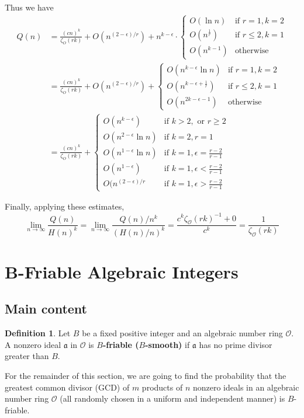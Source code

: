 \documentclass[10pt,a4paper]{article}
\theoremstyle{definition}
\newtheorem{definition}{Definition}[section]
\theoremstyle{remark}
\begin{document}
	Thus we have
	\begin{align}
		Q(n)&=\frac{(cn)^k}{\zeta_{O}(rk)}+O(n^{(2-\epsilon)/r}) + n^{k-\epsilon} \cdot \begin{cases}
			O(\ln n) & \text{if } r=1, k=2 \\
			O(n^\frac{1}{r}) & \text{if } r\leq2, k=1 \\
			O(n^{k-1}) & \text{otherwise}
		\end{cases}\\
		&=\frac{(cn)^k}{\zeta_{O}(rk)}+O(n^{(2-\epsilon)/r}) + \begin{cases}
			O(n^{k-\epsilon}\ln n) & \text{if  } r=1, k=2 \\
			O(n^{k-\epsilon+\frac{1}{r}}) & \text{if } r\leq2, k=1 \\
			O(n^{2k-\epsilon-1}) & \text{otherwise}
		\end{cases}\\ 
	&=\frac{(cn)^k}{\zeta_{O}(rk)} + \begin{cases}
		O(n^{k-\epsilon}) & \text{if  } k>2, \text{ or } r \geq 2\\
		O(n^{2-\epsilon} \ln n) & \text{if  } k=2, r=1 \\
		O(n^{1-\epsilon} \ln n) & \text{if } k=1, \epsilon=\frac{r-2}{r-1} \\
		O(n^{1-\epsilon}) & \text{if } k=1, \epsilon< \frac{r-2}{r-1}\\
		O(n^{(2-\epsilon)/r} & \text{if } k=1, \epsilon > \frac{r-2}{r-1}
	\end{cases}
	\end{align}

	Finally, applying these estimates, 
	\begin{equation}
		\lim\limits_{n\to\infty} \frac{Q(n)}{H(n)^k} = \lim\limits_{n\to\infty} \frac{Q(n)/n^k}{(H(n)/n)^k}=\frac{c^k\zeta_\mathcal{O}(rk)^{-1}+0}{c^k}=\frac{1}{\zeta_\mathcal{O}(rk)}
	\end{equation}

\section{B-Friable Algebraic Integers}
\subsection{Main content}

\begin{definition} Let $B$ be a fixed positive integer and an algebraic number ring $\mathcal{O}$. A nonzero ideal $\mathfrak{a}$ in $\mathcal{O}$ is \textbf{$B$-friable ($B$-smooth)} if $\mathfrak{a}$ has no prime divisor greater than $B$. 
\end{definition}
For the remainder of this section, we are going to find the probability that the greatest common divisor (GCD) of $m$ products of $n$ nonzero ideals in an algebraic number ring $\mathcal{O}$ (all randomly chosen in a uniform and independent manner) is $B$-friable. 
\end{document}
